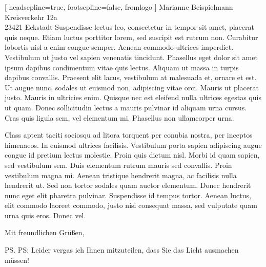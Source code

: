 \documentclass[version=last, fontsize=12pt]{scrlttr2}   %
\begin{document}
\begin{letter}[%
    headsepline=true,%
    footsepline=false,%
    fromlogo%
]{%
    Marianne Beispielmann\\
    Kreisverkehr 12a\\
    23421 Eckstadt%
}
Suspendisse lectus leo, consectetur in tempor sit amet, placerat quis neque. Etiam luctus porttitor lorem, sed suscipit est rutrum non. Curabitur lobortis nisl a enim congue semper. Aenean commodo ultrices imperdiet. Vestibulum ut justo vel sapien venenatis tincidunt. Phasellus eget dolor sit amet ipsum dapibus condimentum vitae quis lectus. Aliquam ut massa in turpis dapibus convallis. Praesent elit lacus, vestibulum at malesuada et, ornare et est. Ut augue nunc, sodales ut euismod non, adipiscing vitae orci. Mauris ut placerat justo. Mauris in ultricies enim. Quisque nec est eleifend nulla ultrices egestas quis ut quam. Donec sollicitudin lectus a mauris pulvinar id aliquam urna cursus. Cras quis ligula sem, vel elementum mi. Phasellus non ullamcorper urna.

Class aptent taciti sociosqu ad litora torquent per conubia nostra, per inceptos himenaeos. In euismod ultrices facilisis. Vestibulum porta sapien adipiscing augue congue id pretium lectus molestie. Proin quis dictum nisl. Morbi id quam sapien, sed vestibulum sem. Duis elementum rutrum mauris sed convallis. Proin vestibulum magna mi. Aenean tristique hendrerit magna, ac facilisis nulla hendrerit ut. Sed non tortor sodales quam auctor elementum. Donec hendrerit nunc eget elit pharetra pulvinar. Suspendisse id tempus tortor. Aenean luctus, elit commodo laoreet commodo, justo nisi consequat massa, sed vulputate quam urna quis eros. Donec vel.

\closing{Mit freundlichen Grüßen,}

\ps PS: Leider vergas ich Ihnen mitzuteilen, dass Sie das Licht ausmachen müssen!


\end{letter}
\end{document}

